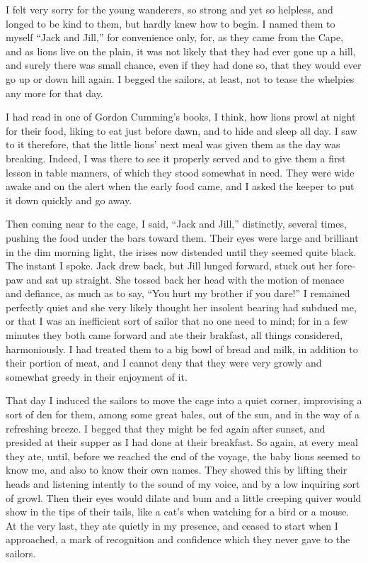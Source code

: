 \documentclass[12pt]{book}
\begin{document}
I felt very sorry for the young wanderers, so strong and yet so helpless, and
longed to be kind to them, but hardly knew how to begin. I named them to myself
“Jack and Jill,” for convenience only, for, as they came from the Cape, and as lions
live on the plain, it was not likely that they had ever gone up a hill, and surely
there was small chance, even if they had done so, that they would ever go up or
down hill again. I begged the sailors, at least, not to tease the whelpies any more
for that day.

I had read in one of Gordon Cumming’s books, I think, how lions prowl at
night for their food, liking to eat just before dawn, and to hide and sleep all day. I
saw to it therefore, that the little lions’ next meal was given them as the day was
breaking. Indeed, I was there to see it properly served and to give them a first
lesson in table manners, of which they stood somewhat in need. They were wide
awake and on the alert when the early food came, and I asked the keeper to put it
down quickly and go away.

Then coming near to the cage, I said, “Jack and Jill,” distinctly, several times,
pushing the food under the bars toward them. Their eyes were large and brilliant
in the dim morning light, the irises now distended until they seemed quite black.
The instant I spoke. Jack drew back, but Jill lunged forward, stuck out her fore‐paw
and sat up straight. She tossed back her head with the motion of menace and
defiance, as much as to say, “You hurt my brother if you dare!” I remained perfectly
quiet and she very likely thought her insolent bearing had subdued me, or that I
was an inefficient sort of sailor that no one need to mind; for in a few minutes they
both came forward and ate their brakfast, all things considered, harmoniously.
I had treated them to a big bowl of bread and milk, in addition to their portion
of meat, and I cannot deny that they were very growly and somewhat greedy in
their enjoyment of it.

That day I induced the sailors to move the cage into a quiet corner, improvising
a sort of den for them, among some great bales, out of the sun, and in the way
of a refreshing breeze. I begged that they might be fed again after sunset, and
presided at their supper as I had done at their breakfast. So again, at every meal
they ate, until, before we reached the end of the voyage, the baby lions seemed to
know me, and also to know their own names. They showed this by lifting their
heads and listening intently to the sound of my voice, and by a low inquiring
sort of growl. Then their eyes would dilate and bum and a little creeping quiver
would show in the tips of their tails, like a cat’s when watching for a bird or a
mouse. At the very last, they ate quietly in my presence, and ceased to start when
I approached, a mark of recognition and confidence which they never gave to the
sailors.
\end{document}
